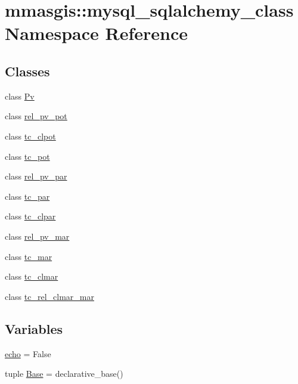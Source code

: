 \hypertarget{namespacemmasgis_1_1mysql__sqlalchemy__class}{
\section{mmasgis::mysql\_\-sqlalchemy\_\-class Namespace Reference}
\label{namespacemmasgis_1_1mysql__sqlalchemy__class}
}
\subsection*{Classes}
\begin{DoxyCompactItemize}
\item 
class \hyperlink{classmmasgis_1_1mysql__sqlalchemy__class_1_1Pv}{Pv}
\item 
class \hyperlink{classmmasgis_1_1mysql__sqlalchemy__class_1_1rel__pv__pot}{rel\_\-pv\_\-pot}
\item 
class \hyperlink{classmmasgis_1_1mysql__sqlalchemy__class_1_1tc__clpot}{tc\_\-clpot}
\item 
class \hyperlink{classmmasgis_1_1mysql__sqlalchemy__class_1_1tc__pot}{tc\_\-pot}
\item 
class \hyperlink{classmmasgis_1_1mysql__sqlalchemy__class_1_1rel__pv__par}{rel\_\-pv\_\-par}
\item 
class \hyperlink{classmmasgis_1_1mysql__sqlalchemy__class_1_1tc__par}{tc\_\-par}
\item 
class \hyperlink{classmmasgis_1_1mysql__sqlalchemy__class_1_1tc__clpar}{tc\_\-clpar}
\item 
class \hyperlink{classmmasgis_1_1mysql__sqlalchemy__class_1_1rel__pv__mar}{rel\_\-pv\_\-mar}
\item 
class \hyperlink{classmmasgis_1_1mysql__sqlalchemy__class_1_1tc__mar}{tc\_\-mar}
\item 
class \hyperlink{classmmasgis_1_1mysql__sqlalchemy__class_1_1tc__clmar}{tc\_\-clmar}
\item 
class \hyperlink{classmmasgis_1_1mysql__sqlalchemy__class_1_1tc__rel__clmar__mar}{tc\_\-rel\_\-clmar\_\-mar}
\end{DoxyCompactItemize}
\subsection*{Variables}
\begin{DoxyCompactItemize}
\item 
\hyperlink{namespacemmasgis_1_1mysql__sqlalchemy__class_a34963431877e166edc5590b79a319397}{echo} = False
\item 
tuple \hyperlink{namespacemmasgis_1_1mysql__sqlalchemy__class_a81c204f68ef6032bbaf3af0368dfb6e8}{Base} = declarative\_\-base()
\end{DoxyCompactItemize}


